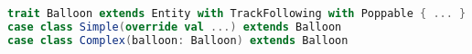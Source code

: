 \begin{lstlisting}[label=code:poppables, language=Scala, caption=Implementazione dei palloncini]
trait Balloon extends Entity with TrackFollowing with Poppable { ... }
case class Simple(override val ...) extends Balloon
case class Complex(balloon: Balloon) extends Balloon
\end{lstlisting}